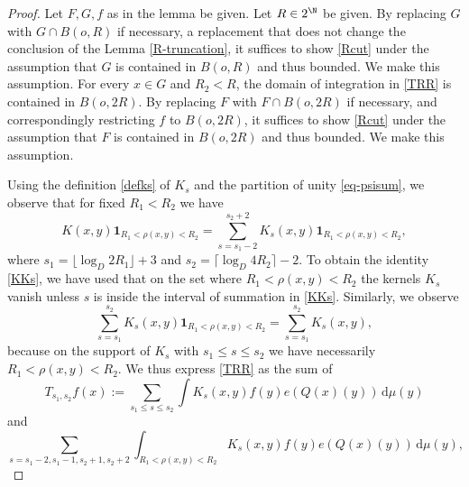 \begin{proof}
\leanok
Let $F,G,f$ as in the lemma be given. Let $R\in 2^\N$ be given.
By replacing $G$ with $G\cap B(o,R)$ if necessary, a replacement that does not change the conclusion of the Lemma \ref{R-truncation}, it suffices to show \eqref{Rcut} under the assumption that $G$ is contained in $B(o,R)$ and thus bounded. We make this assumption. For every $x\in G$ and $R_2 < R$, the domain of integration in \eqref{TRR} is contained in $B(o,2R)$. By replacing $F$ with $F\cap B(o,2R)$ if necessary, and correspondingly restricting $f$ to $B(o, 2R)$, it suffices to show \eqref{Rcut} under the assumption that $F$ is contained in $B(o,2R)$ and thus bounded. We make this assumption.

Using the definition \eqref{defks} of $K_s$ and the partition of unity \eqref{eq-psisum},
we observe that
for fixed $R_1<R_2$ we have
\begin{equation}
    \label{KKs}
    K(x,y)\mathbf{1}_{R_1<\rho(x,y)<R_2}=\sum_{s=s_1-2}^{s_2+2} K_s(x,y) \mathbf{1}_{R_1<\rho(x,y)<R_2},
\end{equation}
where $s_1=\lfloor\log_D 2R_1\rfloor+3$ and $s_2=\lceil\log_D 4R_2\rceil-2$.
To obtain the identity \eqref{KKs}, we have used that on the set where $R_1<\rho(x,y)<R_2$ the kernels $K_s$ vanish unless $s$ is inside the interval of summation in \eqref{KKs}. Similarly, we observe
\begin{equation}
    \label{KsrhoKs}
    \sum_{s=s_1}^{s_2} K_s(x,y) \mathbf{1}_{R_1<\rho(x,y)<R_2} = \sum_{s=s_1}^{s_2} K_s(x,y),
\end{equation}
because on the support of $K_s$ with $s_1\le s\le s_2$ we have necessarily $R_1<\rho(x,y)<R_2$. We thus express \eqref{TRR} as the sum of
\begin{equation}\label{middles}
T_{s_1,s_2}f(x):=\sum_{s_1 \le s\le s_2}
\int K_s(x,y) f(y) e(Q(x)(y)) \, \mathrm{d}\mu(y)
\end{equation}
and
\begin{equation}\label{boundarys}
\sum_{s=s_1-2,s_1-1, s_2+1, s_2+2}
\int_{R_1 < \rho(x,y) < R_2} K_s(x,y) f(y) e(Q(x)(y)) \,
 \mathrm{d}\mu(y),
\end{equation}


\end{proof}
